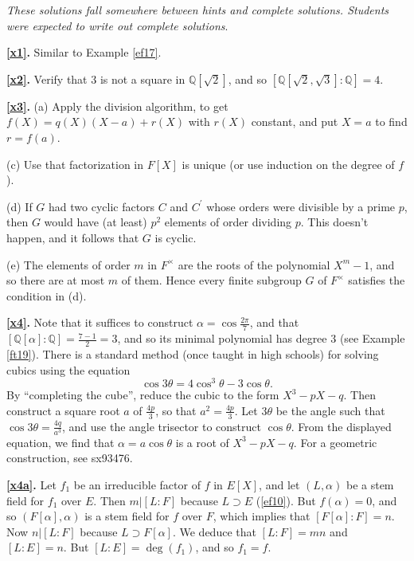 \documentclass[a4paper,11pt,final,openany]{memoir}
\theoremstyle{nonumberplain}
\begin{document}
\textit{These solutions fall somewhere between hints and complete solutions.
Students were expected to write out complete solutions}.

\noindent\textbf{\ref{x1}.} Similar to Example \ref{ef17}.

\medskip\noindent\textbf{\ref{x2}.} Verify that $3$ is not a square in
${\mathbb{Q}}[\sqrt{2}]$, and so $[{\mathbb{Q}}[\sqrt{2},\sqrt{3}%
]\colon{\mathbb{Q}}]=4$.

\medskip\noindent\textbf{\ref{x3}.} (a) Apply the division algorithm, to get
$f(X)=q(X)(X-a)+r(X)$ with $r(X)$ constant, and put $X=a$ to find $r=f(a)$.

\noindent(c) Use that factorization in $F[X]$ is unique (or use induction on
the degree of $f$).

\noindent(d) If $G$ had two cyclic factors $C$ and $C^{\prime}$ whose orders
were divisible by a prime $p$, then $G$ would have (at least) $p^{2}$ elements
of order dividing $p$. This doesn't happen, and it follows that $G$ is cyclic.

\noindent(e) The elements of order $m$ in $F^{\times}$ are the roots of the
polynomial $X^{m}-1$, and so there are at most $m$ of them. Hence every finite
subgroup $G$ of $F^{\times}$ satisfies the condition in (d).

\medskip\noindent\textbf{\ref{x4}.} Note that it suffices to construct
$\alpha=\cos\frac{2\pi}{7}$, and that $[{\mathbb{Q}}[\alpha]\colon{\mathbb{Q}%
}]=\frac{7-1}{2}=3$, and so its minimal polynomial has degree $3$ (see Example
\ref{ft19}). There is a standard method (once taught in high schools) for
solving cubics using the equation
\[
\cos3\theta=4\cos^{3}\theta-3\cos\theta.
\]
By \textquotedblleft completing the cube\textquotedblright, reduce the cubic
to the form $X^{3}-pX-q$. Then construct a square root $a$ of $\frac{4p}{3}$,
so that $a^{2}=\frac{4p}{3}$. Let $3\theta$ be the angle such that
$\cos3\theta=\frac{4q}{a^{3}}$, and use the angle trisector to construct
$\cos\theta$. From the displayed equation, we find that $\alpha=a\cos\theta$
is a root of $X^{3}-pX-q$. For a geometric construction, see sx93476.

\medskip\noindent\textbf{\ref{x4a}.} Let $f_{1}$ be an irreducible factor of
$f$ in $E[X]$, and let $(L,\alpha)$ be a stem field for $f_{1}$ over $E$. Then
$m|[L\colon F]$ because $L\supset E$ (\ref{ef10}). But $f(\alpha)=0$, and so
$(F[\alpha],\alpha)$ is a stem field for $f$ over $F$, which implies that
$[F[\alpha]\colon F]=n$. Now $n|[L\colon F]$ because $L\supset F[\alpha]$. We
deduce that $[L\colon F]=mn$ and $[L\colon E]=n$. But $[L\colon E]=\deg
(f_{1})$, and so $f_{1}=f$.
\end{document}
